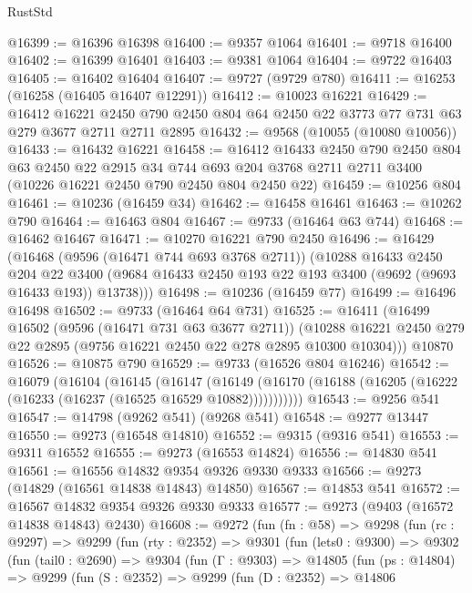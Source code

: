 \begin{lexlean}{RustStd}
\begin{coremodule}
{\begin{coremodule}
{{{{{{{{{{{{{{{{{{{{{{{{{{{{{{{{{{{{{{{{{{{{{{{{{{{{{{{@16399 := @16396 @16398
@16400 := @9357 @1064
@16401 := @9718 @16400
@16402 := @16399 @16401
@16403 := @9381 @1064
@16404 := @9722 @16403
@16405 := @16402 @16404
@16407 := @9727 (@9729 @780)
@16411 := @16253 (@16258 (@16405 @16407 @12291))
@16412 := @10023 @16221
@16429 := @16412
    @16221
    @2450
    @790
    @2450
    @804
    @64
    @2450
    @22
    @3773
    @77
    @731
    @63
    @279
    @3677
    @2711
    @2711
    @2895
@16432 := @9568 (@10055 (@10080 @10056))
@16433 := @16432 @16221
@16458 := @16412
    @16433
    @2450
    @790
    @2450
    @804
    @63
    @2450
    @22
    @2915
    @34
    @744
    @693
    @204
    @3768
    @2711
    @2711
    @3400
    (@10226 @16221 @2450 @790 @2450 @804 @2450 @22)
@16459 := @10256 @804
@16461 := @10236 (@16459 @34)
@16462 := @16458 @16461
@16463 := @10262 @790
@16464 := @16463 @804
@16467 := @9733 (@16464 @63 @744)
@16468 := @16462 @16467
@16471 := @10270 @16221 @790 @2450
@16496 := @16429
    (@16468
      (@9596 (@16471 @744 @693 @3768 @2711))
      (@10288
        @16433
        @2450
        @204
        @22
        @3400
        (@9684 @16433 @2450 @193 @22 @193 @3400 (@9692 (@9693 @16433 @193)) @13738)))
@16498 := @10236 (@16459 @77)
@16499 := @16496 @16498
@16502 := @9733 (@16464 @64 @731)
@16525 := @16411
    (@16499
      @16502
      (@9596 (@16471 @731 @63 @3677 @2711))
      (@10288 @16221 @2450 @279 @22 @2895 (@9756 @16221 @2450 @22 @278 @2895 @10300 @10304)))
    @10870
@16526 := @10875 @790
@16529 := @9733 (@16526 @804 @16246)
@16542 := @16079
    (@16104
      (@16145
        (@16147
          (@16149 (@16170 (@16188 (@16205 (@16222 (@16233 (@16237 (@16525 @16529 @10882)))))))))))
@16543 := @9256 @541
@16547 := @14798 (@9262 @541) (@9268 @541)
@16548 := @9277 @13447
@16550 := @9273 (@16548 @14810)
@16552 := @9315 (@9316 @541)
@16553 := @9311 @16552
@16555 := @9273 (@16553 @14824)
@16556 := @14830 @541
@16561 := @16556 @14832 @9354 @9326 @9330 @9333
@16566 := @9273 (@14829 (@16561 @14838 @14843) @14850)
@16567 := @14853 @541
@16572 := @16567 @14832 @9354 @9326 @9330 @9333
@16577 := @9273 (@9403 (@16572 @14838 @14843) @2430)
@16608 := @9272
    (fun (fn : @58) =>
    @9298
      (fun (rc : @9297) =>
      @9299
        (fun (rty : @2352) =>
        @9301
          (fun (lets0 : @9300) =>
          @9302
            (fun (tail0 : @2690) =>
            @9304
              (fun (Γ : @9303) =>
              @14805
                (fun (ps : @14804) =>
                @9299
                  (fun (S : @2352) =>
                  @9299
                    (fun (D : @2352) =>
                    @14806
}}}}}}}}}}}}}}}}}}}}}}}}}}}}}}}}}}}}}}}}}}}}}}}}}}}}}}}
\end{coremodule}}
\end{coremodule}
\end{lexlean}
